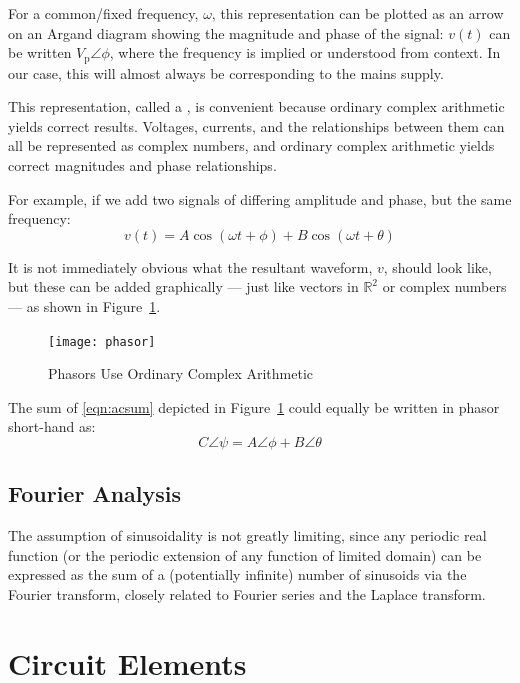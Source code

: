 \documentclass[11pt]{article}
\begin{document}
For a common/fixed frequency, $\omega$, this representation can be
plotted as an arrow on an Argand diagram showing the magnitude and
phase of the signal: $v(t)$ can be written $V_\mathrm{p}\angle\phi$,
where the frequency is implied or understood from context. In our
case, this will almost always be \ruF corresponding to the mains
supply.

This representation, called a , is convenient because
ordinary complex arithmetic yields correct results. Voltages,
currents, and the relationships between them can all be represented as
complex numbers, and ordinary complex arithmetic yields correct
magnitudes and phase relationships.

For example, if we add two signals of differing amplitude and phase,
but the same frequency:
\begin{equation}
\label{eqn:acsum}
v(t) = A\cos(\omega t + \phi) + B\cos(\omega t + \theta)
\end{equation}

It is not immediately obvious what the resultant waveform, $v$, should
look like, but these can be added graphically --- just like vectors in
$\mathbb{R}^2$ or complex numbers --- as shown in
Figure~\ref{fig:phasor}.

\begin{figure}[!ht]
  \centering
  \texttt{[image: phasor]}
  \caption{Phasors Use Ordinary Complex Arithmetic}
  \label{fig:phasor}
\end{figure}

The sum of \eqref{eqn:acsum} depicted in Figure~\ref{fig:phasor} could
equally be written in phasor short-hand as:
\[
C\angle\psi = A\angle\phi + B\angle\theta
\]


\subsection{Fourier Analysis}

The assumption of sinusoidality is not greatly limiting, since any
periodic real function (or the periodic extension of any function of
limited domain) can be expressed as the sum of a (potentially
infinite) number of sinusoids via the Fourier transform, closely
related to Fourier series and the Laplace transform.



\section{Circuit Elements}
\label{sec:circuit-elements}
\end{document}
